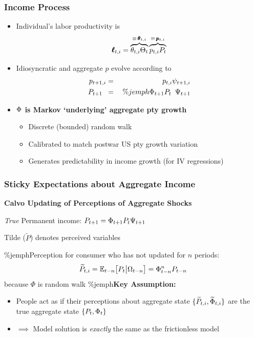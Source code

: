 \documentclass{beamer}\usepackage{dcolumn}
\newcommand{\jbemph}[1]{\textbf{\color{SlideNavy}#1}}
\providecommand{\perc}[1]{\widetilde{#1}}
\begin{document}
\begin{frame}
\frametitle{Income Process}

\begin{itemize}
\item  Individual's labor productivity is
$$
\pmb{\ell}_{t,i} = \overbrace{\theta_{t,i}\Theta_{t}}^{\equiv\,\pmb{\theta}_{t,i}}\overbrace{{p}_{t,i} {P}_{t}}^{\equiv\, \pmb{p}_{t,i}}
$$

\item  Idiosyncratic and aggregate $p$ evolve according to
\begin{eqnarray*}
{{p}}_{t+1,i} & =&  \phantom{\%jemph{\PtyGro}_{t+1}}{{p}}_{t,i} \psi_{t+1,i}  \\
 {P}_{t+1\phantom{,i}} & =&  \%jemph{\PtyGro}_{t+1} {P}_{t\phantom{,i}}\Psi_{t+1}
\end{eqnarray*}


  \item \jbemph{$\Phi$ is Markov `underlying' aggregate pty growth}
    \begin{itemize}
    \setlength{\itemsep}{1mm}
    \item Discrete (bounded) random walk
    \item Calibrated to match postwar US pty growth variation
    \item Generates predictability in income growth (for IV regressions)
    \end{itemize}
  \end{itemize}
\end{frame}

\begin{frame}
\frametitle{Sticky Expectations about Aggregate Income}

\jbemph{\large Calvo Updating of Perceptions of Aggregate Shocks}\\
\bi
\item {\it True} Permanent income: ${P}_{t+1} =  \Phi_{t+1} {P}_{t}\Psi_{t+1}$\\
\item Tilde ($\perc{P}$) denotes perceived variables
\item \%jemph{Perception for consumer who has not updated for $n$ periods:}
$$
  \perc{P}_{t,i}=\Ex_{t-n}\big[P_t\big\vert\Omega_{t-n}\big]=\Phi_{t-n}^nP_{t-n}
$$
because $\Phi$ is random walk
\ei
\bigskip  
\%jemph{\textbf{Key Assumption:}}\\
\begin{itemize}
	\item  People act as if their perceptions about aggregate state $\{\perc{P}_{t,i},\perc{\PtyGro}_{t,i}\}$
	are the true aggregate state $\{P_t,\Phi_t\}$
	\item[] $\implies$ Model solution is \textit{exactly} the same as the frictionless model
\end{itemize}
\end{frame}
\end{document}
